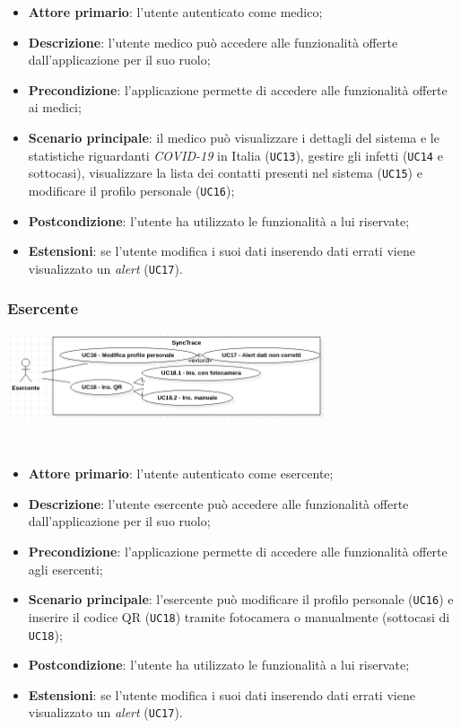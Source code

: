 \begin{itemize}
  \item \textbf{Attore primario}: l'utente autenticato come medico;
  \item \textbf{Descrizione}: l'utente medico può accedere alle funzionalità offerte dall'applicazione per il suo ruolo;
  \item \textbf{Precondizione}: l'applicazione permette di accedere alle funzionalità offerte ai medici;
  \item \textbf{Scenario principale}: il medico può visualizzare i dettagli del sistema e le statistiche riguardanti \textit{COVID-19} in Italia (\texttt{UC13}), gestire gli infetti (\texttt{UC14} e sottocasi), visualizzare la lista dei contatti presenti nel sistema (\texttt{UC15}) e modificare il profilo personale (\texttt{UC16});
  \item \textbf{Postcondizione}: l'utente ha utilizzato le funzionalità a lui riservate;
  \item \textbf{Estensioni}: se l'utente modifica i suoi dati inserendo dati errati viene visualizzato un \textit{alert} (\texttt{UC17}).
\end{itemize}

\subsubsection*{Esercente}

\begin{minipage}{\linewidth}
  \centering
    \includegraphics[height=2.5cm]{immagini/uc/esercente}
\end{minipage} \\

\begin{itemize}
  \item \textbf{Attore primario}: l'utente autenticato come esercente;
  \item \textbf{Descrizione}: l'utente esercente può accedere alle funzionalità offerte dall'applicazione per il suo ruolo;
  \item \textbf{Precondizione}: l'applicazione permette di accedere alle funzionalità offerte agli esercenti;
  \item \textbf{Scenario principale}: l'esercente può modificare il profilo personale (\texttt{UC16}) e inserire il codice QR (\texttt{UC18}) tramite fotocamera o manualmente (sottocasi di \texttt{UC18});
  \item \textbf{Postcondizione}: l'utente ha utilizzato le funzionalità a lui riservate;
  \item \textbf{Estensioni}: se l'utente modifica i suoi dati inserendo dati errati viene visualizzato un \textit{alert} (\texttt{UC17}).
\end{itemize}

